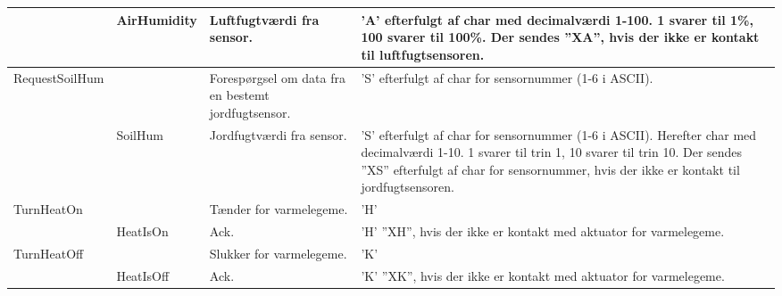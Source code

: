 \begin{longtable}{| p{3cm} | p{3cm} | p{3.2cm} | p{6cm} |}
    ~                                 & AirHumidity                   & Luftfugtværdi fra sensor.                           & ’A’ efterfulgt af char med decimalværdi 1-100. 1 svarer til 1\%, 100 svarer til 100\%. Der sendes ”XA”, hvis der ikke er kontakt til luftfugtsensoren.                                                                                      \\ \hline
    RequestSoilHum                    & ~                             & Forespørgsel om data fra en bestemt jordfugtsensor. & ’S’ efterfulgt af char for sensornummer (1-6 i ASCII).                                                                                                                                                                                        \\ \hline
    ~                                 & SoilHum                       & Jordfugtværdi fra sensor.                           & ’S’ efterfulgt af char for sensornummer (1-6 i ASCII). Herefter char med decimalværdi 1-10. 1 svarer til trin 1, 10 svarer til trin 10. Der sendes ”XS” efterfulgt af char for sensornummer, hvis der ikke er kontakt til jordfugtsensoren. \\ \hline
    TurnHeatOn                        & ~                             & Tænder for varmelegeme.                             & ’H’                                                                                                                                                                                                                                           \\ \hline
    ~                                 & HeatIsOn                      & Ack.                                                & ’H’ \newline ”XH”, hvis der ikke er kontakt med aktuator for varmelegeme.                                                                                                                                                                             \\ \hline
    TurnHeatOff                       & ~                             & Slukker for varmelegeme.                            & ’K’                                                                                                                                                                                                                                           \\ \hline
    ~                                 & HeatIsOff                     & Ack.                                                & ’K’ \newline ”XK”, hvis der ikke er kontakt med aktuator for varmelegeme.                                                                                                                                                                             \\ \hline

\end{longtable}
